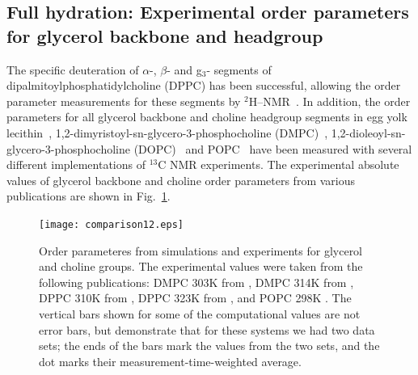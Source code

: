 \documentclass[pre,aps,floatfix,authordate1-4,twocolumn]{revtex4-1}
\begin{document}
\subsection{Full hydration: Experimental order parameters for glycerol backbone and headgroup}\label{experiments}
The specific deuteration of $\alpha$-, $\beta$- and g$_3$- segments of dipalmitoylphosphatidylcholine (DPPC) has been successful, 
allowing the order parameter measurements for these segments by $^2$H--NMR~\cite{gally75,brown77,brown78,akutsu81}.
In addition, the order parameters for all glycerol backbone and choline headgroup segments in egg yolk lecithin~\cite{hong95a},
1,2-dimyristoyl-sn-glycero-3-phosphocholine (DMPC)~\cite{hong95b,gross97,dvinskikh05a}, 
1,2-dioleoyl-sn-glycero-3-phosphocholine (DOPC)~\cite{warschawski05} and POPC~\cite{warschawski05,ferreira13}
have been measured with several different implementations of $^{13}$C NMR experiments.
The experimental absolute values of glycerol backbone and choline order parameters from various publications are shown in Fig.~\ref{HGorderparameters}.
\begin{figure}[]
  \centering
  \texttt{[image: comparison12.eps]}
 \\
  \caption{\label{HGorderparameters}
  Order parameteres from simulations and experiments for glycerol and choline groups.
  The experimental values were taken from the following publications: DMPC 303K from \cite{gross97}, DMPC 314K from \cite{dvinskikh05a}, DPPC 310K from \cite{gally75}, 
  DPPC 323K from \cite{akutsu81}, and POPC 298K \cite{ferreira13}.
  The vertical bars shown for some of the computational values are not error bars, but demonstrate that for 
  these systems we had two data sets; the ends of the bars mark the values from the two sets, and the dot marks their measurement-time-weighted average. 
} 
\end{figure}
\end{document}
